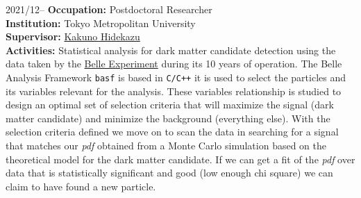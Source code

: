 \documentclass[a4paper]{article}
\begin{document}
\begin{CV}




\item[2021/12--] \textbf{Occupation:} Postdoctoral Researcher
  \\ \textbf{Institution:} Tokyo Metropolitan University
  \\ \textbf{Supervisor:} \href{https://www-hep.phys.se.tmu.ac.jp/index.html}{Kakuno Hidekazu}
  \\ \textbf{Activities:} Statistical analysis for dark matter candidate detection using the data taken
  by the \href{https://belle.kek.jp}{Belle Experiment} during its 10 years of
  operation.
  The Belle Analysis Framework \texttt{basf} is based in \texttt{C/C++} it is
  used to select the particles and its variables relevant for the analysis.
  These variables relationship is studied to design an optimal
  set of selection criteria that will maximize the signal (dark matter
  candidate) and minimize the background (everything else).
  With the selection criteria defined we move on to scan the data in searching
  for a signal that matches our \textit{pdf} obtained from a Monte Carlo
  simulation based on the theoretical model for the dark matter candidate. If we
  can get a fit of the \textit{pdf} over data that is statistically significant
  and good (low enough chi square) we can claim to have found a new particle.


\end{CV}
\end{document}
